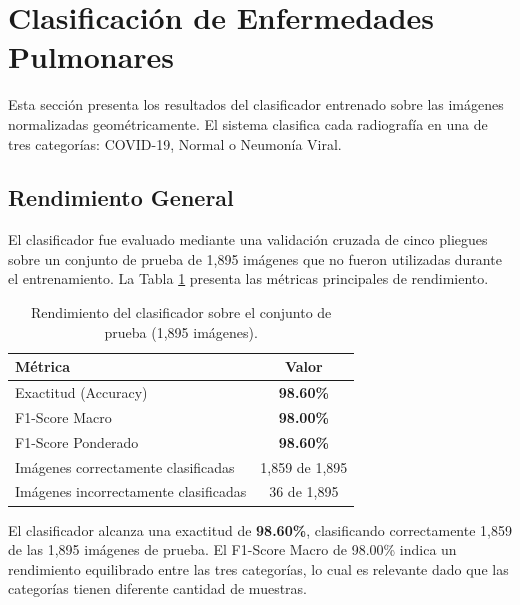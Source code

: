 
\section{Clasificación de Enfermedades Pulmonares}
\label{sec:resultados_clasificacion}

Esta sección presenta los resultados del clasificador entrenado sobre las imágenes normalizadas geométricamente. El sistema clasifica cada radiografía en una de tres categorías: COVID-19, Normal o Neumonía Viral.

\subsection{Rendimiento General}
\label{subsec:metricas_globales}

El clasificador fue evaluado mediante una validación cruzada de cinco pliegues sobre un conjunto de prueba de 1,895 imágenes que no fueron utilizadas durante el entrenamiento. La Tabla \ref{tab:resultados_clasificacion_global} presenta las métricas principales de rendimiento.

\begin{table}[htbp]
    \centering
    \caption{Rendimiento del clasificador sobre el conjunto de prueba (1,895 imágenes).}
    \label{tab:resultados_clasificacion_global}
    \small
    \begin{tabular}{@{}lc@{}}
        \toprule
        \textbf{Métrica} & \textbf{Valor} \\
        \midrule
        Exactitud (Accuracy) & \textbf{98.60\%} \\
        F1-Score Macro & \textbf{98.00\%} \\
        F1-Score Ponderado & \textbf{98.60\%} \\
        \midrule
        Imágenes correctamente clasificadas & 1,859 de 1,895 \\
        Imágenes incorrectamente clasificadas & 36 de 1,895 \\
        \bottomrule
    \end{tabular}
\end{table}

El clasificador alcanza una exactitud de \textbf{98.60\%}, clasificando correctamente 1,859 de las 1,895 imágenes de prueba. El F1-Score Macro de 98.00\% indica un rendimiento equilibrado entre las tres categorías, lo cual es relevante dado que las categorías tienen diferente cantidad de muestras.

